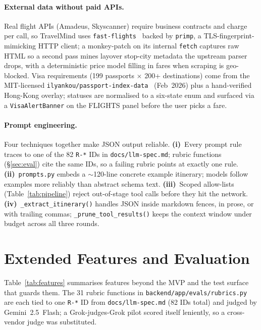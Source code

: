 \documentclass{article}
\begin{document}
\paragraph{External data without paid APIs.}
\label{sec:visa}
Real flight APIs (Amadeus, Skyscanner) require business contracts and
charge per call, so TravelMind uses
\texttt{fast-flights}~\cite{fastflights} backed by \texttt{primp}, a
TLS-fingerprint-mimicking HTTP client; a monkey-patch on its internal
\texttt{fetch} captures raw HTML so a second pass mines layover
stop-city metadata the upstream parser drops, with a deterministic
price model filling in fares when scraping is geo-blocked.
Visa requirements (199 passports $\times$ 200+ destinations) come
from the MIT-licensed
\texttt{ilyankou/passport-index-data}~\cite{passport-index} (Feb~2026)
plus a hand-verified Hong-Kong overlay; statuses are normalised to a
six-state enum and surfaced via a \texttt{VisaAlertBanner} on the
FLIGHTS panel before the user picks a fare.

\paragraph{Prompt engineering.}
Four techniques together make JSON output reliable.
\textbf{(i)}~Every prompt rule traces to one of the 82
\texttt{R-*} IDs in \texttt{docs/llm-spec.md}; rubric functions
(\S\ref{sec:eval}) cite the same IDs, so a failing rubric points at
exactly one rule.
\textbf{(ii)}~\texttt{prompts.py} embeds a $\sim$120-line concrete
example itinerary; models follow examples more reliably than abstract
schema text.
\textbf{(iii)}~Scoped allow-lists (Table~\ref{tab:pipeline}) reject
out-of-stage tool calls before they hit the network.
\textbf{(iv)}~\texttt{\_extract\_itinerary()} handles JSON inside
markdown fences, in prose, or with trailing commas;
\texttt{\_prune\_tool\_results()} keeps the context window under
budget across all three rounds.

\section{Extended Features and Evaluation}
\label{sec:extras}
\label{sec:eval}

Table~\ref{tab:features} summarises features beyond the MVP and the
test surface that guards them. The 31 rubric functions in
\texttt{backend/app/evals/rubrics.py} are each tied to one
\texttt{R-*} ID from \texttt{docs/llm-spec.md} (82 IDs total) and
judged by Gemini~2.5~Flash; a Grok-judges-Grok pilot scored itself
leniently, so a cross-vendor judge was substituted.
\end{document}
